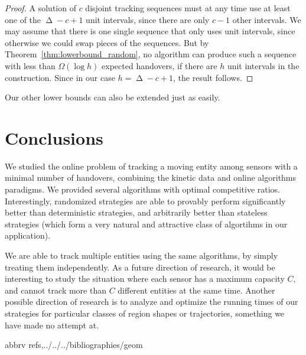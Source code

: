 \documentclass[runningheads]{llncs}
\DeclareMathOperator {\ply}{\Delta}
\begin{document}
    \begin {proof}
      A solution of $c$ disjoint tracking sequences must at any time use at least one of the $\ply - c + 1$ unit intervals, since there are only $c-1$ other intervals.
      We may assume that there is one single sequence that only uses unit intervals, since otherwise we could swap pieces of the sequences. But by Theorem~\ref {thm:lowerbound_random}, no algorithm can produce such a sequence with less than $\Omega (\log h)$ expected handovers, if there are $h$ unit intervals in the construction. Since in our case $h = \ply - c + 1$, the result follows.
    \end {proof}

Our other lower bounds can also be extended just as easily.



















\section {Conclusions}

  We studied the online problem of tracking a moving entity among sensors with a minimal number of handovers, combining the kinetic data and online algorithms paradigms.
  We provided several algorithms with optimal competitive ratios. Interestingly, randomized strategies are able to provably perform significantly better than deterministic strategies, and arbitrarily better than stateless strategies (which form a very natural and attractive class of algortihms in our application).
  
  We are able to track multiple entities using the same algorithms, by simply treating them independently. As a future direction of research, it would be interesting to study the situation where each sensor has a maximum capacity $C$, and cannot track more than $C$ different entities at the same time.
  Another possible direction of research is to analyze and optimize the running times of our strategies for particular classes of region shapes or trajectories, something we have made no attempt at.


{\small\raggedright
 {abbrv}
 {refs,../../../bibliographies/geom}
}
\end{document}
